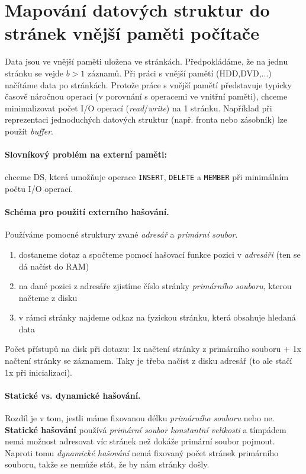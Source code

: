 \documentclass[a4paper]{article}      %
\begin{document}
\section{Mapování datových struktur do stránek vnější paměti počítače}
Data jsou ve vnější paměti uložena ve stránkách. Předpokládáme, že na jednu stránku se vejde $b > 1$ záznamů. 
Při práci s vnější pamětí (HDD,DVD,...) načítáme data po stránkách. Protože práce s vnější pamětí představuje typicky časově náročnou operaci (v porovnání s operacemi ve vnitřní paměti), chceme minimalizovat počet I/O operací (\emph{read}/\emph{write}) na 1 stránku. 
Například při reprezentaci jednoduchých datových struktur (např. fronta nebo zásobník) lze použít \emph{buffer}.

\paragraph{Slovníkový problém na externí paměti:} chceme DS, která umožňuje operace \verb+INSERT+, \verb+DELETE+ a \verb+MEMBER+ při minimálním počtu I/O operací.

\paragraph{Schéma pro použití externího hašování.} Používáme pomocné struktury zvané \emph{adresář} a \emph{primární soubor}.
\begin{enumerate}
\item dostaneme dotaz a spočteme pomocí hašovací funkce pozici v \emph{adresáři} (ten se dá načíst do RAM)
\item na dané pozici z adresáře zjistíme číslo stránky \emph{primárního souboru}, kterou načteme z disku
\item v rámci stránky najdeme odkaz na fyzickou stránku, která obsahuje hledaná data
\end{enumerate}
Počet přístupů na disk při dotazu: 1x načtení stránky z primárního souboru + 1x načtení stránky se záznamem.
Taky je třeba načíst z disku adresář (to ale stačí 1x při inicializaci). 

\paragraph{Statické vs. dynamické hašování.}
Rozdíl je v tom, jestli máme fixovanou délku \emph{primárního souboru} nebo ne. \textbf{Statické hašování} používá \emph{primární soubor konstantní velikosti} a tímpádem nemá možnost adresovat víc stránek než dokáže primární soubor pojmout.
Naproti tomu \emph{dynamické hašování} nemá fixovaný počet stránek primárního souboru, takže se nemůže stát, že by nám stránky došly.
\end{document}
